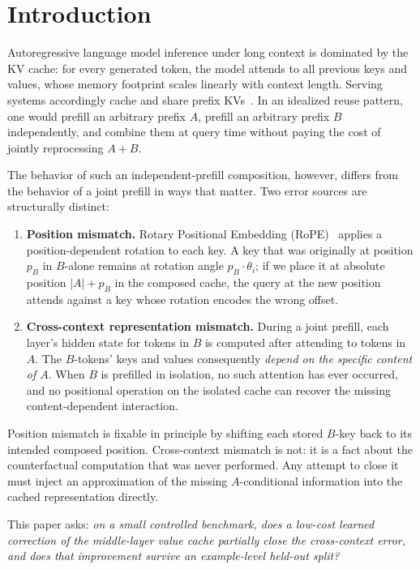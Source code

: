 \documentclass[11pt]{article}
\begin{document}
\section{Introduction}

Autoregressive language model inference under long context is dominated by the KV cache: for every generated token, the model attends to all previous keys and values, whose memory footprint scales linearly with context length. Serving systems accordingly cache and share prefix KVs~\citep{kwon2023vllm,zheng2024sglang,gim2023prompt}. In an idealized reuse pattern, one would prefill an arbitrary prefix $A$, prefill an arbitrary prefix $B$ independently, and combine them at query time without paying the cost of jointly reprocessing $A+B$.

The behavior of such an independent-prefill composition, however, differs from the behavior of a joint prefill in ways that matter. Two error sources are structurally distinct:

\begin{enumerate}[leftmargin=*]
    \item \textbf{Position mismatch.} Rotary Positional Embedding (RoPE)~\citep{su2021roformer} applies a position-dependent rotation to each key. A key that was originally at position $p_B$ in $B$-alone remains at rotation angle $p_B \cdot \theta_i$; if we place it at absolute position $|A| + p_B$ in the composed cache, the query at the new position attends against a key whose rotation encodes the wrong offset.
    \item \textbf{Cross-context representation mismatch.} During a joint prefill, each layer's hidden state for tokens in $B$ is computed after attending to tokens in $A$. The $B$-tokens' keys and values consequently \emph{depend on the specific content of $A$}. When $B$ is prefilled in isolation, no such attention has ever occurred, and no positional operation on the isolated cache can recover the missing content-dependent interaction.
\end{enumerate}

Position mismatch is fixable in principle by shifting each stored $B$-key back to its intended composed position. Cross-context mismatch is not: it is a fact about the counterfactual computation that was never performed. Any attempt to close it must inject an approximation of the missing $A$-conditional information into the cached representation directly.

This paper asks: \emph{on a small controlled benchmark, does a low-cost learned correction of the middle-layer value cache partially close the cross-context error, and does that improvement survive an example-level held-out split?}
\end{document}

